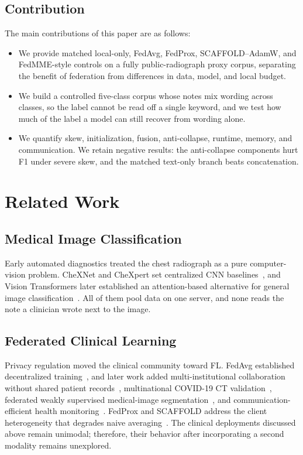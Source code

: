 \documentclass[letterpaper, conference]{IEEEtran}
\begin{document}
\subsection{Contribution}
The main contributions of this paper are as follows:
\begin{itemize}
\item We provide matched local-only, FedAvg, FedProx, SCAFFOLD--AdamW, and
FedMME-style controls on a fully public-radiograph proxy corpus, separating the
benefit of federation from differences in data, model, and local budget.
\item We build a controlled five-class corpus whose notes mix wording across classes, so the label cannot be read off a single keyword, and we test how much of the label a model can still recover from wording alone.
\item We quantify skew, initialization, fusion, anti-collapse, runtime, memory,
and communication. We retain negative results: the anti-collapse components hurt
F1 under severe skew, and the matched text-only branch beats concatenation.
\end{itemize}


\section{Related Work}

\subsection{Medical Image Classification}
Early automated diagnostics treated the chest radiograph as a pure computer-vision
problem. CheXNet and CheXpert set centralized CNN
baselines~\cite{Rajpurkar2017chexnet,Irvin2019}, and Vision Transformers later
established an attention-based alternative for general image
classification~\cite{Dosovitskiy2021}. All of them
pool data on one server, and none reads the note a clinician wrote next to the image.

\subsection{Federated Clinical Learning}
Privacy regulation moved the clinical community toward FL. FedAvg established
decentralized training~\cite{McMahan2017}, and later work added multi-institutional
collaboration without shared patient records~\cite{Sheller2020}, multinational
COVID-19 CT validation~\cite{Dou2021}, federated weakly supervised medical-image
segmentation~\cite{Lin2025fedlppa}, and communication-efficient health
monitoring~\cite{Chu2022globecom}. FedProx and SCAFFOLD address the client heterogeneity
  that degrades naive averaging~\cite{Li2020fedprox,Karimireddy2020,Tian2022globecom}. The clinical
  deployments discussed above remain unimodal; therefore, their behavior after
  incorporating a second modality remains unexplored.
\end{document}
